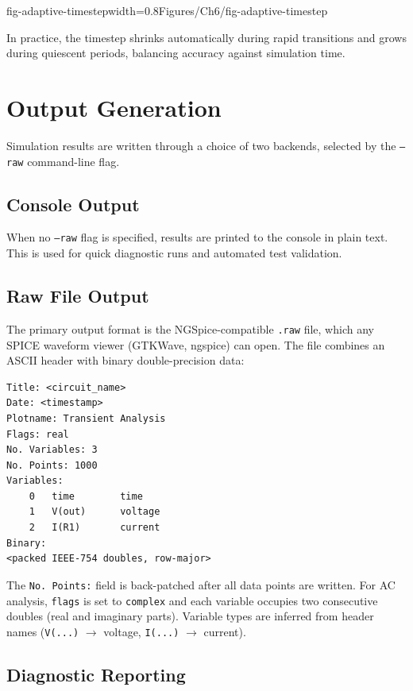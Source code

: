   {fig-adaptive-timestep}{width=0.8\textwidth}{Figures/Ch6/fig-adaptive-timestep}

In practice, the timestep shrinks automatically during rapid transitions and grows during quiescent periods, balancing accuracy against simulation time.

\section{Output Generation}

Simulation results are written through a choice of two backends, selected by the \texttt{--raw} command-line flag.

\subsection{Console Output}

When no \texttt{--raw} flag is specified, results are printed to the console in plain text. This is used for quick diagnostic runs and automated test validation.

\subsection{Raw File Output}

The primary output format is the NGSpice-compatible \texttt{.raw} file, which any SPICE waveform viewer (GTKWave, ngspice) can open. The file combines an ASCII header with binary double-precision data:
\begin{verbatim}
Title: <circuit_name>
Date: <timestamp>
Plotname: Transient Analysis
Flags: real
No. Variables: 3
No. Points: 1000
Variables:
    0   time        time
    1   V(out)      voltage
    2   I(R1)       current
Binary:
<packed IEEE-754 doubles, row-major>
\end{verbatim}
The \texttt{No. Points:} field is back-patched after all data points are written. For AC analysis, \texttt{flags} is set to \texttt{complex} and each variable occupies two consecutive doubles (real and imaginary parts). Variable types are inferred from header names (\texttt{V(...)} $\rightarrow$ voltage, \texttt{I(...)} $\rightarrow$ current).

\subsection{Diagnostic Reporting}

